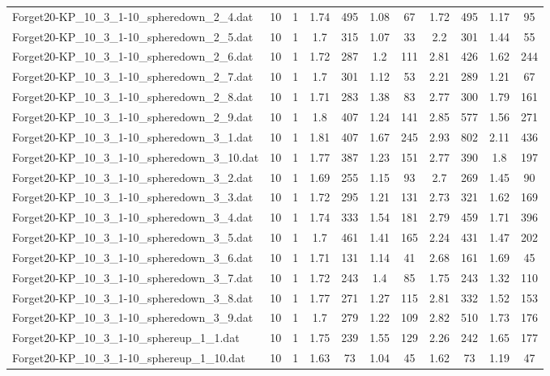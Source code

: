 \begin{table}[!ht]
\begin{tabular}{lcccccccccc}
Forget20-KP\_10\_3\_1-10\_spheredown\_2\_4.dat & 10 & 1 & 1.74 & 495 & 1.08 & 67 & 1.72 & 495 & 1.17 & 95 \\
Forget20-KP\_10\_3\_1-10\_spheredown\_2\_5.dat & 10 & 1 & 1.7 & 315 & 1.07 & 33 & 2.2 & 301 & 1.44 & 55 \\
Forget20-KP\_10\_3\_1-10\_spheredown\_2\_6.dat & 10 & 1 & 1.72 & 287 & 1.2 & 111 & 2.81 & 426 & 1.62 & 244 \\
Forget20-KP\_10\_3\_1-10\_spheredown\_2\_7.dat & 10 & 1 & 1.7 & 301 & 1.12 & 53 & 2.21 & 289 & 1.21 & 67 \\
Forget20-KP\_10\_3\_1-10\_spheredown\_2\_8.dat & 10 & 1 & 1.71 & 283 & 1.38 & 83 & 2.77 & 300 & 1.79 & 161 \\
Forget20-KP\_10\_3\_1-10\_spheredown\_2\_9.dat & 10 & 1 & 1.8 & 407 & 1.24 & 141 & 2.85 & 577 & 1.56 & 271 \\
Forget20-KP\_10\_3\_1-10\_spheredown\_3\_1.dat & 10 & 1 & 1.81 & 407 & 1.67 & 245 & 2.93 & 802 & 2.11 & 436 \\
Forget20-KP\_10\_3\_1-10\_spheredown\_3\_10.dat & 10 & 1 & 1.77 & 387 & 1.23 & 151 & 2.77 & 390 & 1.8 & 197 \\
Forget20-KP\_10\_3\_1-10\_spheredown\_3\_2.dat & 10 & 1 & 1.69 & 255 & 1.15 & 93 & 2.7 & 269 & 1.45 & 90 \\
Forget20-KP\_10\_3\_1-10\_spheredown\_3\_3.dat & 10 & 1 & 1.72 & 295 & 1.21 & 131 & 2.73 & 321 & 1.62 & 169 \\
Forget20-KP\_10\_3\_1-10\_spheredown\_3\_4.dat & 10 & 1 & 1.74 & 333 & 1.54 & 181 & 2.79 & 459 & 1.71 & 396 \\
Forget20-KP\_10\_3\_1-10\_spheredown\_3\_5.dat & 10 & 1 & 1.7 & 461 & 1.41 & 165 & 2.24 & 431 & 1.47 & 202 \\
Forget20-KP\_10\_3\_1-10\_spheredown\_3\_6.dat & 10 & 1 & 1.71 & 131 & 1.14 & 41 & 2.68 & 161 & 1.69 & 45 \\
Forget20-KP\_10\_3\_1-10\_spheredown\_3\_7.dat & 10 & 1 & 1.72 & 243 & 1.4 & 85 & 1.75 & 243 & 1.32 & 110 \\
Forget20-KP\_10\_3\_1-10\_spheredown\_3\_8.dat & 10 & 1 & 1.77 & 271 & 1.27 & 115 & 2.81 & 332 & 1.52 & 153 \\
Forget20-KP\_10\_3\_1-10\_spheredown\_3\_9.dat & 10 & 1 & 1.7 & 279 & 1.22 & 109 & 2.82 & 510 & 1.73 & 176 \\
Forget20-KP\_10\_3\_1-10\_sphereup\_1\_1.dat & 10 & 1 & 1.75 & 239 & 1.55 & 129 & 2.26 & 242 & 1.65 & 177 \\
Forget20-KP\_10\_3\_1-10\_sphereup\_1\_10.dat & 10 & 1 & 1.63 & 73 & 1.04 & 45 & 1.62 & 73 & 1.19 & 47 \\

\end{tabular}
\end{table}
